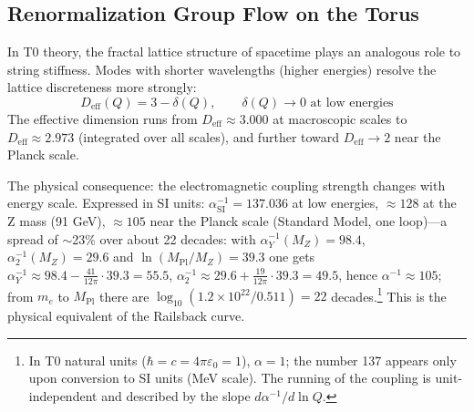 \subsection{Renormalization Group Flow on the Torus}

In T0 theory, the fractal lattice structure of spacetime plays an analogous role to string stiffness. Modes with shorter wavelengths (higher energies) resolve the lattice discreteness more strongly:
\begin{equation}
	D_\text{eff}(Q) = 3 - \delta(Q), \qquad \delta(Q) \to 0 \text{ at low energies}
\end{equation}
The effective dimension runs from $D_\text{eff} \approx 3.000$ at macroscopic scales to $D_\text{eff} \approx 2.973$ (integrated over all scales), and further toward $D_\text{eff} \to 2$ near the Planck scale.

The physical consequence: the electromagnetic coupling strength changes with energy scale. Expressed in SI units: $\alpha_\text{SI}^{-1} = 137.036$ at low energies, $\approx 128$ at the Z mass (91 GeV), $\approx 105$ near the Planck scale (Standard Model, one loop)---a spread of $\sim$23\% over about 22 decades: with $\alpha_Y^{-1}(M_Z) = 98.4$, $\alpha_2^{-1}(M_Z) = 29.6$ and $\ln(M_\text{Pl}/M_Z) = 39.3$ one gets $\alpha_Y^{-1} \approx 98.4 - \frac{41}{12\pi}\cdot39.3 = 55.5$, $\alpha_2^{-1} \approx 29.6 + \frac{19}{12\pi}\cdot39.3 = 49.5$, hence $\alpha^{-1} \approx 105$; from $m_e$ to $M_\text{Pl}$ there are $\log_{10}(1.2\times10^{22}/0.511) = 22$ decades.\footnote{In T0 natural units ($\hbar = c = 4\pi\varepsilon_0 = 1$), $\alpha = 1$; the number 137 appears only upon conversion to SI units (MeV scale). The running of the coupling is unit-independent and described by the slope $d\alpha^{-1}/d\ln Q$.} This is the physical equivalent of the Railsback curve.

\begin{table}[h]
\centering
{}
\caption{Inharmonicity of a stiff string and renormalization group flow on the fractal torus.}
\label{tab:inharmonicity}
\end{table}

